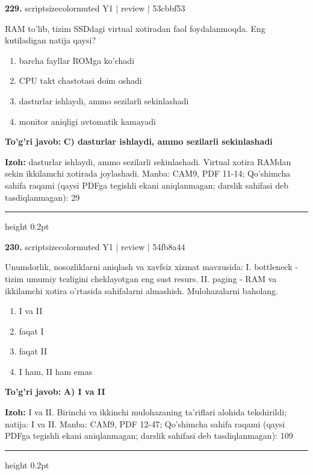 \documentclass[10pt,a4paper]{article}
\begin{document}
{\bfseries\sffamily\color{ink} 229.} {scriptsizecolor{muted} Y1 | review | 53cbbf53}
\par
RAM to'lib, tizim SSDdagi virtual xotiradan faol foydalanmoqda. Eng kutiladigan natija qaysi?
\begin{enumerate}[label=\Alph*),leftmargin=9mm]
\item barcha fayllar ROMga ko'chadi
\item CPU takt chastotasi doim oshadi
\item dasturlar ishlaydi, ammo sezilarli sekinlashadi
\item monitor aniqligi avtomatik kamayadi
\end{enumerate}
\begin{tcolorbox}[enhanced,breakable,colback=teal!4,colframe=teal!60!black,boxrule=0.45pt,arc=1.2mm,left=2.7mm,right=2.7mm,top=1.8mm,bottom=1.8mm,before skip=2mm,after skip=2mm]
{\bfseries\sffamily\color{teal}To'g'ri javob:} \textbf{C) dasturlar ishlaydi, ammo sezilarli sekinlashadi}
\par\smallskip
{\bfseries Izoh:} dasturlar ishlaydi, ammo sezilarli sekinlashadi. Virtual xotira RAMdan sekin ikkilamchi xotirada joylashadi. Manba: CAM9, PDF 11-14; Qo'shimcha sahifa raqami (qaysi PDFga tegishli ekani aniqlanmagan; darslik sahifasi deb tasdiqlanmagan): 29
\end{tcolorbox}
\vspace{2mm}\hrule height 0.2pt\vspace{3mm}

{\bfseries\sffamily\color{ink} 230.} {scriptsizecolor{muted} Y1 | review | 54fb8a44}
\par
Unumdorlik, nosozliklarni aniqlash va xavfsiz xizmat mavzusida: I. bottleneck - tizim umumiy tezligini cheklayotgan eng sust resurs. II. paging - RAM va ikkilamchi xotira o'rtasida sahifalarni almashish. Mulohazalarni baholang.
\begin{enumerate}[label=\Alph*),leftmargin=9mm]
\item I va II
\item faqat I
\item faqat II
\item I ham, II ham emas
\end{enumerate}
\begin{tcolorbox}[enhanced,breakable,colback=teal!4,colframe=teal!60!black,boxrule=0.45pt,arc=1.2mm,left=2.7mm,right=2.7mm,top=1.8mm,bottom=1.8mm,before skip=2mm,after skip=2mm]
{\bfseries\sffamily\color{teal}To'g'ri javob:} \textbf{A) I va II}
\par\smallskip
{\bfseries Izoh:} I va II. Birinchi va ikkinchi mulohazaning ta'riflari alohida tekshirildi; natija: I va II. Manba: CAM9, PDF 12-47; Qo'shimcha sahifa raqami (qaysi PDFga tegishli ekani aniqlanmagan; darslik sahifasi deb tasdiqlanmagan): 109
\end{tcolorbox}
\vspace{2mm}\hrule height 0.2pt\vspace{3mm}
\end{document}
